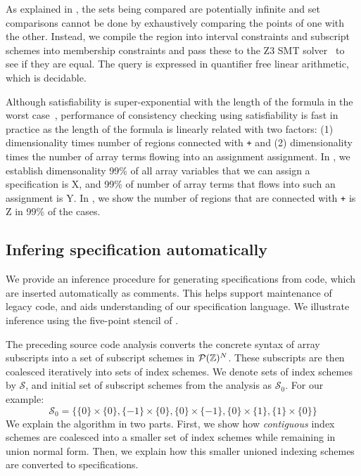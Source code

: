 As explained in , the sets being compared are
potentially infinite and set comparisons cannot be done by exhaustively
comparing the points of one with the other. Instead, we compile the region into
interval constraints and subscript schemes into membership constraints and pass
these to the \textsc{Z3} SMT solver~\citep{de2008z3} to see if they are equal. The
query is expressed in quantifier free linear arithmetic, which is decidable.

Although satisfiability is super-exponential with the length of the formula in
the worst case~\cite{fischer1974super}, performance of consistency checking
using satisfiability is fast in practice as the length of the formula is linearly
related with two factors: (1) dimensionality times number of regions connected
with \texttt{+} and (2) dimensionality times the number of array terms flowing
into an assignment assignment. In , we establish dimensonality
99\% of all array variables that we can assign a specification is X, and 99\% of
number of array terms that flows into such an assignment is Y. In
, we show the number of regions that are connected with
\texttt{+} is Z in 99\% of the cases.


\subsection{Infering specification automatically}
\label{subsec:inference}
%
\noindent
We provide an inference procedure for generating specifications from
code, which are inserted automatically as comments. This helps support
maintenance of legacy code, and aids understanding of our
specification language. We illustrate inference using the
five-point stencil of .

The preceding source code analysis converts the concrete syntax of
array subscripts into a set of subscript schemes in
$\mathcal{P}(\textnormal{$\mathbb{Z}$})^N$. These subscripts are then coalesced iteratively
into sets of index schemes. We denote sets of index schemes by
$\mathcal{S}$, and initial set of subscript schemes from the analysis
as $\mathcal{S}_0$. For our example:
%
\begin{equation*}
\mathcal{S}_0 = \{\{0\} \times \{0\}, \{-1\} \times \{0\},
\{0\} \times \{-1\}, \{0\} \times \{1\}, \{1\} \times \{0\}\}
\end{equation*}
%
%
We explain the algorithm in two parts. First, we show how
\emph{contiguous} index schemes are coalesced into a smaller set of
index schemes while remaining in union normal form. Then, we explain
how this smaller unioned indexing schemes are converted to
specifications.

